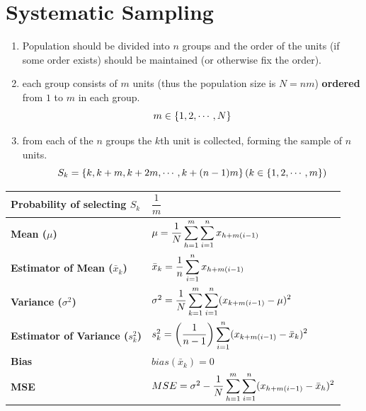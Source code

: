 \section{Systematic Sampling \cite{ism-1}}\label{Systematic Sampling}

\begin{enumerate}
    \item Population should be divided into $n$ groups and the order of the units (if some order exists) should be maintained (or otherwise fix the order).

    \item each group consists of $m$ units (thus the population size is $N = nm$) \textbf{ordered} from $1$ to $m$ in each group.
    \[
        m \in \left\{1,2,\cdots,N\right\}
    \]

    \item from each of the $n$ groups the $k$th unit is collected, forming the sample of $n$ units. 
    \[
        S_k = \dCurlyBrac{ k, k+m,k+2m,\cdots,k+(n-1)m }
        \hfill
        (k \in \dCurlyBrac{1,2,\cdots,m})
    \]
\end{enumerate}

\begin{customTableWrapper}{1}
\begin{longtable}{|p{5cm}|p{9cm}|}
    \hline\endfirsthead
    \hline\endhead
    \hline\endfoot
    \hline\endlastfoot

    \textbf{Probability of selecting $S_k$} & $\dfrac{1}{m}$\\[1ex]
    \hline

    \textbf{Mean ($\mu$)} & $
        \mu = \dfrac{1}{N}
        \displaystyle\sum_{h=1}^{m}
        \displaystyle\sum_{i=1}^{n} 
        x_{h+m(i-1)}
    $\\[1ex]
    \hline

    \textbf{Estimator of Mean ($\bar{x}_k$)} & $
        \bar{x}_k = 
        \dfrac{1}{n} \displaystyle\sum_{i=1}^{n}
        x_{h+m(i-1)}
    $\\[1ex]
    \hline

    \textbf{Variance ($\sigma^2$)} & $
        \sigma^2 = 
        \dfrac{1}{N}
        \displaystyle\sum_{k=1}^{m}
        \displaystyle\sum_{i=1}^{n}
        (x_{k+m(i-1)} - \mu)^2
    $\\[1ex]
    \hline

    \textbf{Estimator of Variance ($s_k^2$)} & $
        s_k^2 = \left(\dfrac{1}{n-1}\right)
        \displaystyle\sum_{i=1}^{n}
        (x_{k+m(i-1)} - \bar{x}_k)^2
    $\\[1ex]
    \hline

    \textbf{Bias} & $bias(\bar{x}_k) = 0$\\
    \hline

    \textbf{MSE} & $
        MSE = \sigma^2 -
        \dfrac{1}{N}
        \displaystyle\sum_{h=1}^{m}
        \displaystyle\sum_{i=1}^{n}
        (x_{h+m(i-1)} - \bar{x}_h)^2
    $\\[1ex]
    \hline
\end{longtable}
\end{customTableWrapper}


